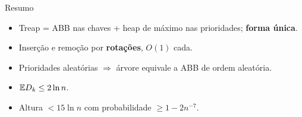 \documentclass[aspectratio=169,11pt]{beamer}
\theoremstyle{definition}
\begin{document}
\begin{frame}{Resumo}
  \begin{itemize}
  \item Treap = ABB nas chaves + heap de máximo nas prioridades;
    \textbf{forma única}.
  \item Inserção e remoção por \textbf{rotações}, $O(1)$ cada.
  \item Prioridades aleatórias $\Rightarrow$ árvore equivale a ABB de
    ordem aleatória.
  \item $\mathbb{E}{D_k}\le2\ln n$.
  \item Altura $<15\ln n$ com probabilidade $\ge1-2n^{-7}$.
  \end{itemize}
\end{frame}
\end{document}
